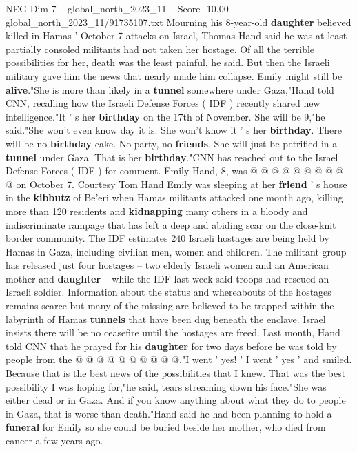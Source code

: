\begin{textsample}{NEG Dim 7 – global\_north\_2023\_11 – Score -10.00 – global\_north\_2023\_11/91735107.txt}  \label{ex:f7_neg_046}
Mourning his 8-year-old \textbf{daughter} believed killed in Hamas ' October 7 attacks on Israel, Thomas Hand said he was at least partially consoled militants had not taken her hostage.
Of all the terrible possibilities for her, death was the least painful, he said.
But then the Israeli military gave him the news that nearly made him collapse.
Emily might still be \textbf{alive}."She is more than likely in a \textbf{tunnel} somewhere under Gaza,"Hand told CNN, recalling how the Israeli Defense Forces ( IDF ) recently shared new intelligence."It ' s her \textbf{birthday} on the 17th of November.
She will be 9,"he said."She won't even know day it is.
She won't know it ' s her \textbf{birthday}.
There will be no \textbf{birthday} cake.
No party, no \textbf{friends}.
She will just be petrified in a \textbf{tunnel} under Gaza.
That is her \textbf{birthday}."CNN has reached out to the Israel Defense Forces ( IDF ) for comment.
Emily Hand, 8, was @ @ @ @ @ @ @ @ @ @ on October 7.
Courtesy Tom Hand Emily was sleeping at her \textbf{friend} ' s house in the \textbf{kibbutz} of Be'eri when Hamas militants attacked one month ago, killing more than 120 residents and \textbf{kidnapping} many others in a bloody and indiscriminate rampage that has left a deep and abiding scar on the close-knit border community.
The IDF estimates 240 Israeli hostages are being held by Hamas in Gaza, including civilian men, women and children.
The militant group has released just four hostages -- two elderly Israeli women and an American mother and \textbf{daughter} -- while the IDF last week said troops had rescued an Israeli soldier.
Information about the status and whereabouts of the hostages remains scarce but many of the missing are believed to be trapped within the labyrinth of Hamas \textbf{tunnels} that have been dug beneath the enclave.
Israel insists there will be no ceasefire until the hostages are freed.
Last month, Hand told CNN that he prayed for his \textbf{daughter} for two days before he was told by people from the @ @ @ @ @ @ @ @ @ @."I went ' yes! ' I went ' yes ' and smiled.
Because that is the best news of the possibilities that I knew.
That was the best possibility I was hoping for,"he said, tears streaming down his face."She was either dead or in Gaza.
And if you know anything about what they do to people in Gaza, that is worse than death."Hand said he had been planning to hold a \textbf{funeral} for Emily so she could be buried beside her mother, who died from cancer a few years ago.

\end{textsample}
